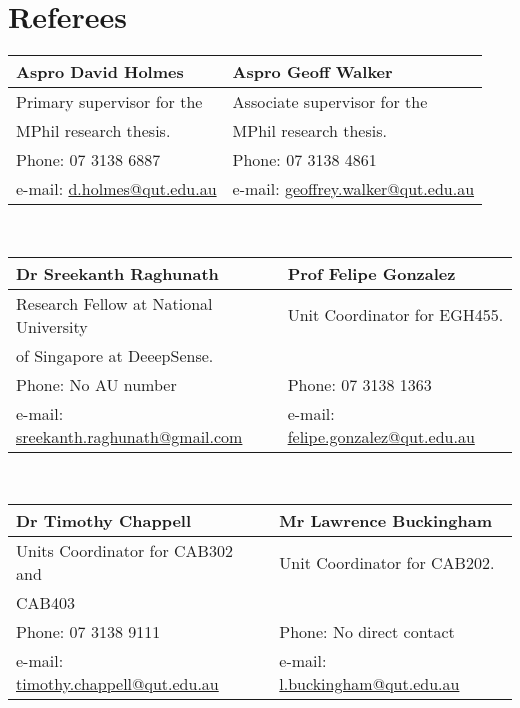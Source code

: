 \documentclass[a4paper,12pt]{article}
\begin{document}
\newpage
{}
{}{
\section{Referees}
\begin{tabular}{ |p{8cm}||p{8cm}| }
	\hline
	\textbf{Aspro David Holmes} & \textbf{Aspro Geoff Walker}  \\ 
	\hline
	Primary supervisor for the & Associate supervisor for the \\  
	MPhil research thesis. & MPhil research thesis.   \\
	\hline
	Phone: 07 3138 6887 & Phone: 07 3138 4861 \\
	\hline
	e-mail: \href{mailto:d.holmes@qut.edu.au}{d.holmes@qut.edu.au} & e-mail: \href{mailto:igeoffrey.walker@qut.edu.au}{geoffrey.walker@qut.edu.au} \\
	\hline
\end{tabular}
\\ [4pc]
\begin{tabular}{ |p{8cm}||p{8cm}| }
	\hline
	\textbf{Dr Sreekanth Raghunath} & \textbf{Prof Felipe Gonzalez }  \\ 
	\hline
	Research Fellow at National University & Unit Coordinator for EGH455. \\  
	of Singapore at DeeepSense. &    \\
	\hline
	Phone: No AU number & Phone: 07 3138 1363 \\
	\hline
	e-mail: \href{mailto:sreekanth.raghunath@gmail.com}{sreekanth.raghunath@gmail.com} & e-mail: \href{mailto:felipe.gonzalez@qut.edu.au}{felipe.gonzalez@qut.edu.au} \\
	\hline
\end{tabular}
\\ [4pc]
\begin{tabular}{ |p{8cm}||p{8cm}| }
	\hline
	\textbf{Dr Timothy Chappell} & \textbf{Mr Lawrence Buckingham }  \\ 
	\hline
	Units Coordinator for CAB302 and & Unit Coordinator for CAB202. \\  
	 CAB403 &    \\
	\hline
	Phone: 07 3138 9111 & Phone: No direct contact \\
	\hline
	e-mail: \href{mailto:timothy.chappell@qut.edu.au}{timothy.chappell@qut.edu.au} & e-mail: \href{mailto:l.buckingham@qut.edu.au}{l.buckingham@qut.edu.au} \\

\end{tabular}}
\end{document}
